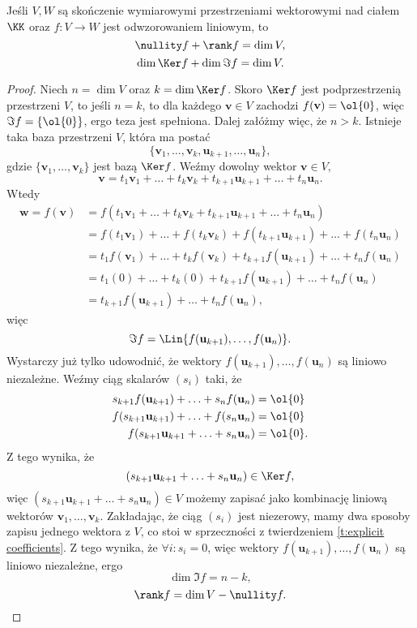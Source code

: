 \begin{theorem}[o rzędzie]
    \label{t:rank-nullity}
    Jeśli $V, W$ są skończenie wymiarowymi przestrzeniami wektorowymi nad ciałem $\KK$ oraz $f : V \to W$ jest odwzorowaniem liniowym, to
    \[ \nullity f + \rank f = \dim V, \]
    \[ \dim \Ker f + \dim \Im f = \dim V. \]
\end{theorem}
\begin{proof}
    Niech $n = \dim V$ oraz $k = \dim \Ker f$. Skoro $\Ker f$ jest podprzestrzenią przestrzeni $V$, to jeśli $n = k$, to dla każdego $\mathbf{v} \in V$ zachodzi $f(\mathbf{v}) = \ol{0}$, więc $\Im f = \{\ol{0}\}$, ergo teza jest spełniona. Dalej załóżmy więc, że $n > k$. Istnieje taka baza przestrzeni $V$, która ma postać
    \[ \{\mathbf{v}_1, \ldots, \mathbf{v}_k, \mathbf{u}_{k+1}, \ldots, \mathbf{u}_n\}, \]
    gdzie $\{\mathbf{v}_1, \ldots, \mathbf{v}_k\}$ jest bazą $\Ker f$. Weźmy dowolny wektor $\mathbf{v} \in V,$
    \[ \mathbf{v} = t_1\mathbf{v}_1 + \ldots + t_k\mathbf{v}_k + t_{k+1}\mathbf{u}_{k+1} + \ldots + t_n\mathbf{u}_n. \]
    Wtedy
    \begin{align*}
        \mathbf{w} = f(\mathbf{v}) &= f(t_1\mathbf{v}_1 + \ldots + t_k\mathbf{v}_k + t_{k+1}\mathbf{u}_{k+1} + \ldots + t_n\mathbf{u}_n) \\
            &= f(t_1\mathbf{v}_1) + \ldots + f(t_k\mathbf{v}_k) + f(t_{k+1}\mathbf{u}_{k+1}) + \ldots + f(t_n\mathbf{u}_n) \\
            &= t_1f(\mathbf{v}_1) + \ldots + t_kf(\mathbf{v}_k) + t_{k+1}f(\mathbf{u}_{k+1}) + \ldots + t_nf(\mathbf{u}_n) \\
            &= t_1(0) + \ldots + t_k(0) + t_{k+1}f(\mathbf{u}_{k+1}) + \ldots + t_nf(\mathbf{u}_n) \\
            &= t_{k+1}f(\mathbf{u}_{k+1}) + \ldots + t_nf(\mathbf{u}_n),
    \end{align*}
    więc
    \[ \Im f = \Lin\{f(\mathbf{u}_{k+1}), \ldots, f(\mathbf{u}_n)\}. \]
    Wystarczy już tylko udowodnić, że wektory $f(\mathbf{u}_{k+1}), \ldots, f(\mathbf{u}_n)$ są liniowo niezależne. Weźmy ciąg skalarów $(s_i)$ taki, że
    \begin{align*}
        s_{k+1}f(\mathbf{u}_{k+1}) + \ldots + s_nf(\mathbf{u}_n) &= \ol{0} \\
        f(s_{k+1}\mathbf{u}_{k+1}) + \ldots + f(s_n\mathbf{u}_n) &= \ol{0} \\
        f(s_{k+1}\mathbf{u}_{k+1} + \ldots + s_n\mathbf{u}_n) &= \ol{0}.
    \end{align*}
    Z tego wynika, że
    \[ (s_{k+1}\mathbf{u}_{k+1} + \ldots + s_n\mathbf{u}_n) \in \Ker f, \]
    więc $(s_{k+1}\mathbf{u}_{k+1} + \ldots + s_n\mathbf{u}_n) \in V$ możemy zapisać jako kombinację liniową wektorów $\mathbf{v}_1, \ldots, \mathbf{v}_k$. Zakładając, że ciąg $(s_i)$ jest niezerowy, mamy dwa sposoby zapisu jednego wektora z $V$, co stoi w sprzeczności z twierdzeniem \ref{t:explicit coefficients}. Z tego wynika, że $\forall i : s_i = 0$, więc wektory $f(\mathbf{u}_{k+1}), \ldots, f(\mathbf{u}_n)$ są liniowo niezależne, ergo
    \[ \dim \Im f = n - k, \]
    \[ \rank f = \dim V - \nullity f. \]
\end{proof}

